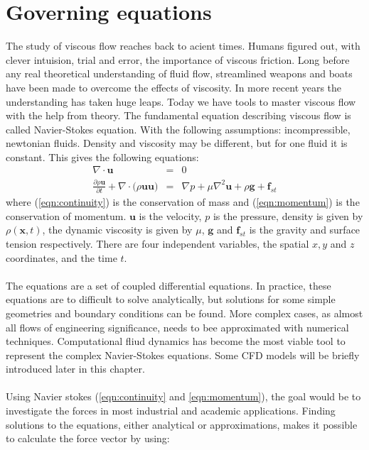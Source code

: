 \documentclass[a4paper, 12pt]{report}
\begin{document}
\section{Governing equations}
The study of viscous flow reaches back to acient times. Humans figured out, with clever intuision, trial and error, the importance of viscous friction. Long before any real theoretical understanding of fluid flow, streamlined weapons and boats have been made to overcome the effects of viscosity. In more recent years the understanding has taken huge leaps. Today we have tools to master viscous flow with the help from theory. The fundamental equation describing viscous flow is called Navier-Stokes equation\cite{White}. With the following assumptions: incompressible, newtonian fluids. Density and viscosity may be different, but for one fluid it is constant. This gives the following equations:
\begin{eqnarray}
\label{eqn:continuity}
\nabla \cdot \mathbf{u} &=& 0 \\ 
\label{eqn:momentum}
\frac{\partial \rho \mathbf{u}}{\partial t} + \nabla \cdot \big(\rho \mathbf{u} \mathbf{u}\big) &=& \nabla p + \mu \nabla^2 \mathbf{u} + \rho\mathbf{g} + \mathbf{f}_{st} 
\end{eqnarray}
where (\ref{eqn:continuity}) is the conservation of mass and (\ref{eqn:momentum}) is the conservation of momentum. $\mathbf{u}$ is the velocity, $p$ is the pressure, density is given by $\rho(\mathbf{x},t)$, the dynamic viscosity is given by $\mu$, $\mathbf{g}$ and $\mathbf{f}_{st}$ is the gravity and surface tension respectively. There are four independent variables, the spatial $x, y$ and $z$ coordinates, and the time $t$.\\
\\
The equations are a set of coupled differential equations. In practice, these equations are to difficult to solve analytically, but solutions for some simple geometries and boundary conditions can be found. More complex cases, as almost all flows of engineering significance, needs to bee approximated with numerical techniques. Computational fliud dynamics has become the most viable tool to represent the complex Navier-Stokes equations. Some CFD models will be briefly introduced later in this chapter.\\
\\
Using Navier stokes (\ref{eqn:continuity} and \ref{eqn:momentum}), the goal would be to investigate the forces in most industrial and academic applications. Finding solutions to the equations, either analytical or approximations, makes it possible to calculate the force vector by using:
\end{document}
